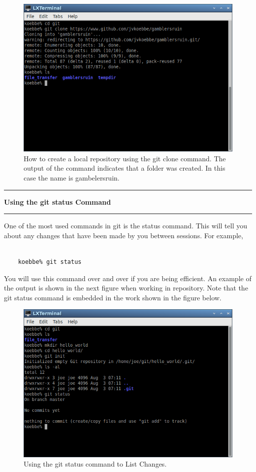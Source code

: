 \documentclass[10pt,fleqn]{article}
\begin{document}
\begin{figure}[h]
\centering
\includegraphics[width=5.0in]{../images/git_05.png}
\vskip0.1in
\caption{How to create a local repository using the git clone command. The
output of the command indicates that a folder was created. In this case the
name is gambelersruin.}
\end{figure}
\eject
\vskip0.1in\hrule\vskip0.1in\noindent
{\bf Using the git status Command} 
\vskip0.1in\hrule\vskip0.1in\noindent
One of the most used commands in git is the status command. This will tell you
about any changes that have been made by you between sessions. For example,
\begin{verbatim}

    koebbe% git status

\end{verbatim}
You will use this command over and over if you are being efficient. An example
of the output is shown in the next figure when working in repository. Note that
the git status command is embedded in the work shown in the figure below.
\vfill
\begin{figure}[h]
\centering
\includegraphics[width=5.0in]{../images/git_06.png}
\vskip0.1in
\caption{Using the git status command to List Changes.}
\end{figure}
\end{document}
